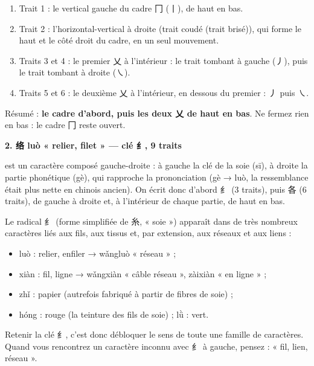 \documentclass[11pt]{article}
\newcommand{\zh}[1]{\ifmmode\text{#1}\else{#1}\fi}
\begin{document}
\begin{methode}
\begin{enumerate}
\item Trait 1 : le vertical gauche du cadre 冂 (丨), de haut en bas.
\item Trait 2 : l'horizontal-vertical à droite (trait coudé (trait brisé)), qui forme le haut et le côté droit du cadre, en un seul mouvement.
\item Traits 3 et 4 : le premier 乂 à l'intérieur : le trait tombant à gauche (丿), puis le trait tombant à droite (㇏).
\item Traits 5 et 6 : le deuxième 乂 à l'intérieur, en dessous du premier : 丿 puis ㇏.
\end{enumerate}
Résumé : \textbf{le cadre d'abord, puis les deux 乂 de haut en bas}. Ne fermez rien en bas : le cadre 冂 reste ouvert.
\end{methode}

\textbf{2. 络 luò « relier, filet » — clé 纟, 9 traits}\par

\zh{络} est un caractère composé gauche-droite : à gauche la clé de la soie \zh{纟} (sī), à droite la partie phonétique \zh{各} (gè), qui rapproche la prononciation (gè → luò, la ressemblance était plus nette en chinois ancien). On écrit donc d'abord 纟 (3 traits), puis 各 (6 traits), de gauche à droite et, à l'intérieur de chaque partie, de haut en bas.

\begin{propriete}
Le radical 纟 (forme simplifiée de 糸, « soie ») apparaît dans de très nombreux caractères liés aux fils, aux tissus et, par extension, aux réseaux et aux liens :
\begin{itemize}
\item \zh{络} luò : relier, enfiler → \zh{网络} wǎngluò « réseau » ;
\item \zh{线} xiàn : fil, ligne → \zh{网线} wǎngxiàn « câble réseau », \zh{在线} zàixiàn « en ligne » ;
\item \zh{纸} zhǐ : papier (autrefois fabriqué à partir de fibres de soie) ;
\item \zh{红} hóng : rouge (la teinture des fils de soie) ; \zh{绿} lǜ : vert.
\end{itemize}
Retenir la clé 纟, c'est donc débloquer le sens de toute une famille de caractères. Quand vous rencontrez un caractère inconnu avec 纟 à gauche, pensez : « fil, lien, réseau ».
\end{propriete}
\end{document}
